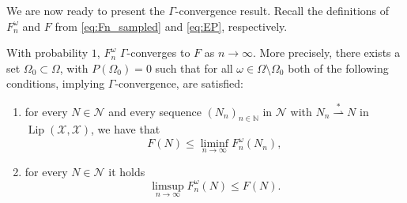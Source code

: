 \documentclass[onefignum,onetabnum]{siamonline250211}
\newcommand{\Lip}{\operatorname{Lip}}
\newcommand{\N}{\mathcal{N}}
\newcommand{\weakk}{\stackrel{\ast}{\rightharpoonup}}
\newcommand{\cX}{\mathcal{X}}
\begin{document}
We are now ready to present the $\Gamma$-convergence result. Recall the definitions of $F_n^\omega$ and $F$ from \cref{eq:Fn_sampled} and \cref{eq:EP}, respectively.
\begin{theorem}\label{thm:gammaconv} With probability $1$, $F_n^{\omega}$ $\Gamma$-converges to $F$ as $n\to\infty$. More precisely, there exists a set $\Omega_0\subset \Omega$, with $P(\Omega_0)=0$ such that for all $\omega \in \Omega\setminus \Omega_0$ both of the following conditions, implying $\Gamma$-convergence, are satisfied:
\begin{enumerate}[label=(\roman*),leftmargin=*]
    \item \label{itm:gammaconv_i} for every $N\in\N$ and every sequence $(N_n)_{n\in\mathbb{N}}$ in $\N$ with $N_n\weakk N$ in $\Lip(\cX, \cX)$, we have that
    $$
    F(N)\leq \liminf_{n\to\infty} F_n^{\omega}(N_n),
    $$
    \item \label{itm:gammaconv_ii} for every $N\in\N$ it holds 
    \[\limsup_{n\to\infty} F_n^{\omega}(N)\leq F(N).\]
\end{enumerate}
\end{theorem}
\end{document}

